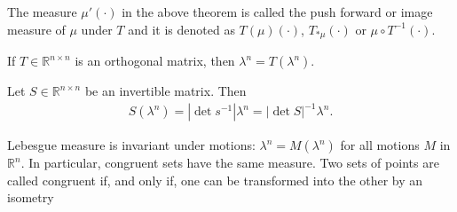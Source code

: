     \begin{definition}
        The measure $\mu'(\cdot)$ in the above theorem is called the push forward or image measure of $\mu$ under $T$ and it is denoted as 
        $T(\mu)(\cdot)$, $T_{*\mu}(\cdot)$ or $\mu\circ T^{-1}(\cdot)$.
    \end{definition}

    \begin{theorem}
        If $T\in \mathbb R^{n\times n} $ is an orthogonal matrix, then $\lambda^n = T(\lambda^n).$
    \end{theorem}

    \begin{theorem}
        Let $S\in\mathbb R^{n\times n}$ be an invertible matrix. Then 
        \begin{align*}
        S(\lambda^n) = |\det s^{-1}|\lambda^n = |\det S|^{-1}\lambda^n.    
        \end{align*}
    \end{theorem}

    \begin{corollary}
        Lebesgue measure is invariant under motions: $\lambda^n=M(\lambda^n)$ for all motions $M$ in $\mathbb R^n$. In particular, congruent sets have the same measure. Two sets of points are called congruent if, and only if, one can be transformed into the other by an isometry
    \end{corollary}
